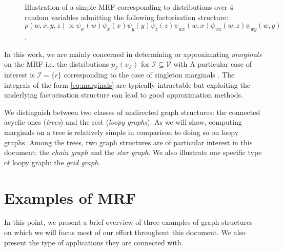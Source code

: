 \begin{figure}[!h]
\center
{}
\caption{\label{fig:simple-MRF}Illustration of a simple MRF corresponding to distributions over 4 random variables admitting the following factorisation structure:\\ $p(w,x,y,z)\propto \psi_{w}(w)\psi_{x}(x)\psi_{y}(y)\psi_{z}(z)\psi_{wx}(w,x)\psi_{wz}(w,z)\psi_{wy}(w,y)$.}
\end{figure}
In this work, we are mainly concerned in determining or approximating  \emph{marginals} on the MRF i.e. the distributions $p_{\mathcal I}(x_{\mathcal I})$ for $\mathcal I\subseteq\mathcal V$  with
A particular case of interest is $\mathcal I=\{r\}$ corresponding to the case of singleton marginals \citep[section 2.3]{wainwright08}. The integrals of the form \eqref{eq:marginals} are typically intractable but exploiting the underlying factorisation structure can lead to good approximation methods.

We distinguish between two classes of undirected graph structures: the connected acyclic ones (\emph{trees}) and the rest (\emph{loopy graphs}). As we will show, computing marginals on a tree is relatively simple in comparison to doing so on loopy graphs. 
Among the trees, two graph structures are of particular interest in this document: the \emph{chain graph} and the \emph{star graph}. 
We also illustrate one specific type of loopy graph: the \emph{grid graph}.


\section{\label{intro:exMRF}Examples of MRF}
In this point, we present a brief overview of three examples of graph structures on which we will focus most of our effort throughout this document. 
We also present the type of applications they are connected with. 

